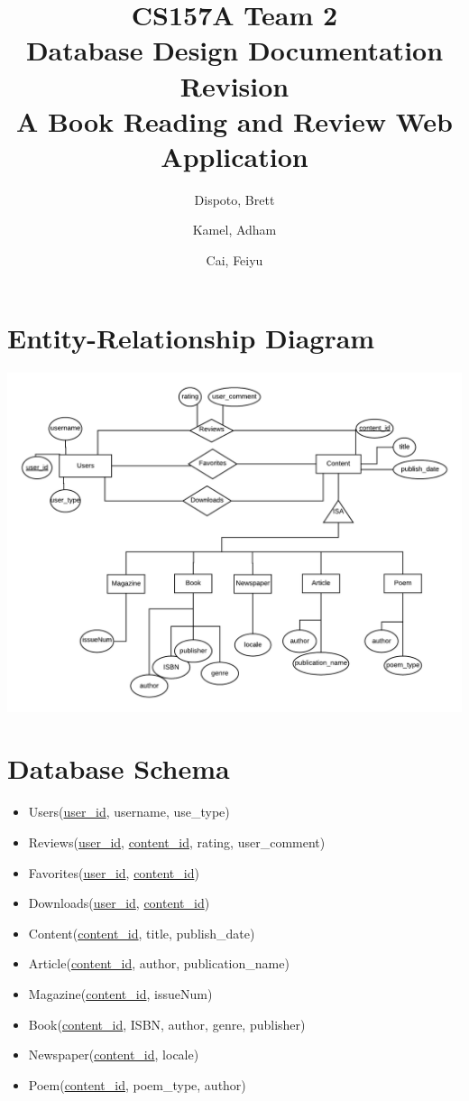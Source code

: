 \documentclass[letter, 12pt, titlepage]{article}
\author{
	Dispoto, Brett\\
        \and
        Kamel, Adham\\
        \and
        Cai, Feiyu\\
}
\title{CS157A Team 2 \\ Database Design Documentation Revision \\
        \large A Book Reading and Review Web Application}
\begin{document}
  \maketitle
  	\section{Entity-Relationship Diagram}
	\includegraphics[scale=1]{erd-rev.png}
	\section{Database Schema}
		\begin{itemize}
			\item Users(\underline{user\_id}, username, use\_type)
			\item Reviews(\underline{user\_id}, \underline{content\_id}, rating, user\_comment)
			\item Favorites(\underline{user\_id}, \underline{content\_id})
			\item Downloads(\underline{user\_id}, \underline{content\_id})
			\item Content(\underline{content\_id}, title, publish\_date)
			\item Article(\underline{content\_id}, author, publication\_name)
			\item Magazine(\underline{content\_id}, issueNum)
			\item Book(\underline{content\_id}, ISBN, author, genre, publisher)
			\item Newspaper(\underline{content\_id}, locale)
			\item Poem(\underline{content\_id}, poem\_type, author)
		\end{itemize}
\end{document}
